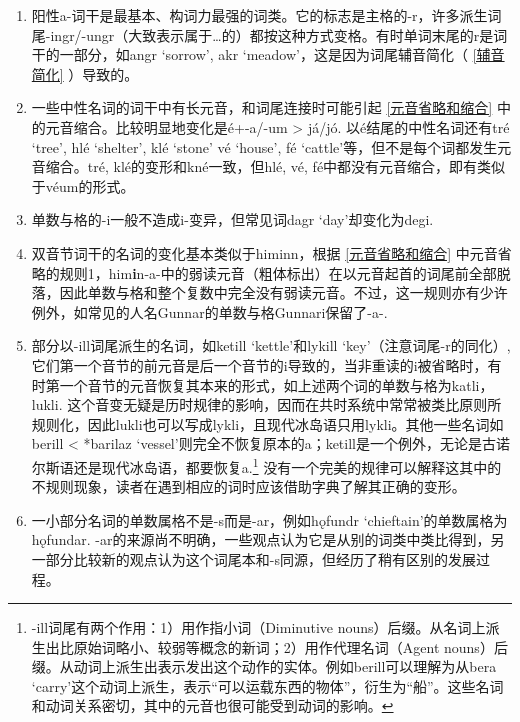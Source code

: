 \begin{enumerate}[1)]
  \item
        阳性a-词干是最基本、构词力最强的词类。它的标志是主格的-r，许多派生词尾-ingr/-ungr（大致表示属于\ldots 的）都按这种方式变格。有时单词末尾的r是词干的一部分，如angr
        `sorrow', akr
        `meadow'，这是因为词尾辅音简化（ \ref{辅音简化} ）导致的。
  \item
        一些中性名词的词干中有长元音，和词尾连接时可能引起 \ref{元音省略和缩合} 中的元音缩合。比较明显地变化是é+-a/-um
        \textgreater{} já/jó. 以é结尾的中性名词还有tré `tree', hlé `shelter',
        klé `stone' vé `house', fé
        `cattle'等，但不是每个词都发生元音缩合。tré,
        klé的变形和kné一致，但hlé, vé,
        fé中都没有元音缩合，即有类似于véum的形式。
  \item
        单数与格的-i一般不造成i-变异，但常见词dagr `day'却变化为degi.
  \item
        双音节词干的名词的变化基本类似于himinn，根据 \ref{元音省略和缩合} 中元音省略的规则1，him\textbf{i}n-a-中的弱读元音（粗体标出）在以元音起首的词尾前全部脱落，因此单数与格和整个复数中完全没有弱读元音。不过，这一规则亦有少许例外，如常见的人名Gunnar的单数与格Gunnari保留了-a-.
  \item
        部分以-ill词尾派生的名词，如ketill `kettle'和lykill
        `key'（注意词尾-r的同化）,
        它们第一个音节的前元音是后一个音节的i导致的，当非重读的i被省略时，有时第一个音节的元音恢复其本来的形式，如上述两个词的单数与格为katli，lukli.
        这个音变无疑是历时规律的影响，因而在共时系统中常常被类比原则所规则化，因此lukli也可以写成lykli，且现代冰岛语只用lykli。其他一些名词如berill
        \textless{} *barilaz
        `vessel'则完全不恢复原本的a；ketill是一个例外，无论是古诺尔斯语还是现代冰岛语，都要恢复a.\footnote{-ill词尾有两个作用：1）用作指小词（Diminutive
          nouns）后缀。从名词上派生出比原始词略小、较弱等概念的新词；2）用作代理名词（Agent
          nouns）后缀。从动词上派生出表示发出这个动作的实体。例如berill可以理解为从bera
          `carry'这个动词上派生，表示``可以运载东西的物体''，衍生为``船''。这些名词和动词关系密切，其中的元音也很可能受到动词的影响。}
        没有一个完美的规律可以解释这其中的不规则现象，读者在遇到相应的词时应该借助字典了解其正确的变形。
  \item
        一小部分名词的单数属格不是-s而是-ar，例如hǫfundr
        `chieftain'的单数属格为hǫfundar.
        -ar的来源尚不明确，一些观点认为它是从别的词类中类比得到，另一部分比较新的观点认为这个词尾本和-s同源，但经历了稍有区别的发展过程。
\end{enumerate}

